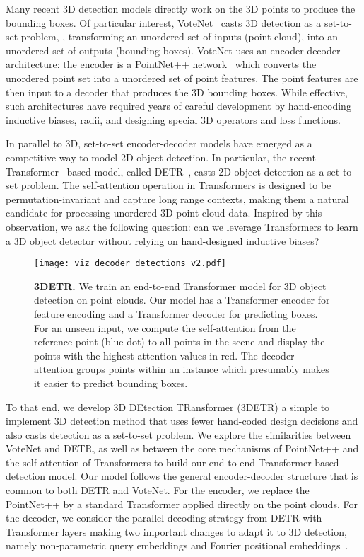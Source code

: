 \documentclass[10pt,twocolumn,letterpaper]{article}
\newcommand{\OURS}{3DETR\xspace}
\begin{document}
Many recent 3D detection models directly work on the 3D points to produce the bounding boxes.
Of particular interest, VoteNet~\cite{qi2019votenet} casts 3D detection as a set-to-set problem, \ie, transforming an unordered set of inputs (point cloud),
into an unordered set of outputs (bounding boxes).
VoteNet uses an encoder-decoder architecture:
the encoder is a PointNet++ network~\cite{qi2017pointnet} which converts the unordered point set into a unordered set of point features.
The point features are then input to a decoder that produces the 3D bounding boxes.
While effective, such architectures have required years of
careful development
by hand-encoding inductive biases, radii, and designing special 3D operators and loss functions.

In parallel to 3D, set-to-set encoder-decoder models have emerged as a competitive way to model 2D object detection.
In particular, the recent Transformer~\cite{vaswani2017attention} based model, called DETR~\cite{carion2020end}, casts 2D object detection as a set-to-set problem.
The self-attention operation in Transformers is designed to be permutation-invariant and capture long range contexts,
making them a natural candidate for processing unordered 3D point cloud data.
Inspired by this observation, we ask the following question: can we leverage
Transformers
to learn a 3D object detector without relying on hand-designed inductive biases?


\begin{figure}[!t]
\texttt{[image: viz\_decoder\_detections\_v2.pdf]}
\caption{\textbf{\OURS.} We train an end-to-end Transformer model for 3D object detection on point clouds.
Our model has a Transformer encoder for feature encoding and a Transformer decoder for predicting boxes.
For an unseen input, we compute the self-attention from the reference point (blue dot) to all points in the scene and display the points with the highest attention values in red.
The decoder attention groups points within an instance which presumably makes it easier to predict bounding boxes.
}
\label{fig:encoder_attn}
\end{figure}

To that end, we develop 3D DEtection TRansformer (\OURS) a simple to implement 3D detection method that uses fewer hand-coded design decisions and also casts detection as a set-to-set problem.
We explore the similarities between VoteNet and DETR, as well as between the core mechanisms of PointNet++ and the self-attention of Transformers to build our end-to-end Transformer-based detection model.
Our model follows the general encoder-decoder structure that is common to both DETR and VoteNet.
For the encoder, we replace the PointNet++ by a standard Transformer applied directly on the point clouds.
For the decoder, we consider the parallel decoding strategy from DETR with Transformer layers making two important changes to adapt it to 3D detection, namely non-parametric query embeddings and Fourier positional embeddings~\cite{tancik2020fourfeat}.
\end{document}
